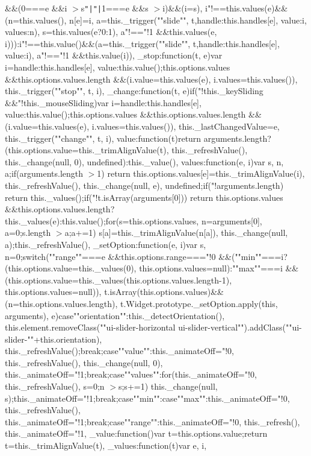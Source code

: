 {\&\&(0===e \&\&i $>$s\texttt{"|}\texttt{"|}1===e \&\&s $>$i)\&\&(i=s), i"!==this.\+values(e)\&\&(n=this.\+values(), n[e]=i, a=this.\+\_\+trigger(""slide"", t,\lcurly{}handle\+:this.\+handles[e], value\+:i, values\+:n\rcurly{}), s=this.\+values(e?0\+:1), a"!=="!1 \&\&this.\+values(e, i)))\+:i"!==this.\+value()\&\&(a=this.\+\_\+trigger(""slide"", t,\lcurly{}handle\+:this.\+handles[e], value\+:i\rcurly{}), a"!=="!1 \&\&this.\+value(i))\rcurly{}, \+\_\+stop\+:function(t, e)\lcurly{}var i=\lcurly{}handle\+:this.\+handles[e], value\+:this.\+value()\rcurly{};this.\+options.\+values \&\&this.\+options.\+values.\+length \&\&(i.\+value=this.\+values(e), i.\+values=this.\+values()), this.\+\_\+trigger(""stop"", t, i)\rcurly{}, \+\_\+change\+:function(t, e)\lcurly{}if("!this.\+\_\+key\+Sliding \&\&"!this.\+\_\+mouse\+Sliding)\lcurly{}var i=\lcurly{}handle\+:this.\+handles[e], value\+:this.\+value()\rcurly{};this.\+options.\+values \&\&this.\+options.\+values.\+length \&\&(i.\+value=this.\+values(e), i.\+values=this.\+values()), this.\+\_\+last\+Changed\+Value=e, this.\+\_\+trigger(""change"", t, i)\rcurly{}\rcurly{}, value\+:function(t)\lcurly{}return arguments.\+length?(this.\+options.\+value=this.\+\_\+trim\+Align\+Value(t), this.\+\_\+refresh\+Value(), this.\+\_\+change(null, 0), undefined)\+:this.\+\_\+value()\rcurly{}, values\+:function(e, i)\lcurly{}var s, n, a;if(arguments.\+length $>$1) return this.\+options.\+values[e]=this.\+\_\+trim\+Align\+Value(i), this.\+\_\+refresh\+Value(), this.\+\_\+change(null, e), undefined;if("!arguments.\+length) return this.\+\_\+values();if("!t.\+is\+Array(arguments[0])) return this.\+options.\+values \&\&this.\+options.\+values.\+length?this.\+\_\+values(e)\+:this.\+value();for(s=this.\+options.\+values, n=arguments[0], a=0;s.\+length $>$a;a+=1) s[a]=this.\+\_\+trim\+Align\+Value(n[a]), this.\+\_\+change(null, a);this.\+\_\+refresh\+Value()\rcurly{}, \+\_\+set\+Option\+:function(e, i)\lcurly{}var s, n=0;switch(""range""===e \&\&this.\+options.\+range==="!0 \&\&(""min""===i?(this.\+options.\+value=this.\+\_\+values(0), this.\+options.\+values=null)\+:""max""===i \&\&(this.\+options.\+value=this.\+\_\+values(this.\+options.\+values.\+length-\/1), this.\+options.\+values=null)), t.\+is\+Array(this.\+options.\+values)\&\&(n=this.\+options.\+values.\+length), t.\+Widget.\+prototype.\+\_\+set\+Option.\+apply(this, arguments), e)\lcurly{}case""orientation""\+:this.\+\_\+detect\+Orientation(), this.\+element.\+remove\+Class(""ui-\/slider-\/horizontal ui-\/slider-\/vertical"").\+add\+Class(""ui-\/slider-\/""+this.\+orientation), this.\+\_\+refresh\+Value();break;case""value""\+:this.\+\_\+animate\+Off="!0, this.\+\_\+refresh\+Value(), this.\+\_\+change(null, 0), this.\+\_\+animate\+Off="!1;break;case""values""\+:for(this.\+\_\+animate\+Off="!0, this.\+\_\+refresh\+Value(), s=0;n $>$s;s+=1) this.\+\_\+change(null, s);this.\+\_\+animate\+Off="!1;break;case""min""\+:case""max""\+:this.\+\_\+animate\+Off="!0, this.\+\_\+refresh\+Value(), this.\+\_\+animate\+Off="!1;break;case""range""\+:this.\+\_\+animate\+Off="!0, this.\+\_\+refresh(), this.\+\_\+animate\+Off="!1\rcurly{}\rcurly{}, \+\_\+value\+:function()\lcurly{}var t=this.\+options.\+value;return t=this.\+\_\+trim\+Align\+Value(t)\rcurly{}, \+\_\+values\+:function(t)\lcurly{}var e, i, }
